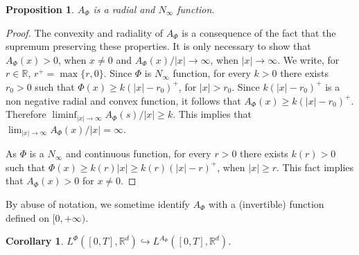 \documentclass[twoside]{article}
\newtheorem{cor}[thm]{Corollary}
\newtheorem{prop}[thm]{Proposition}
\theoremstyle{remark}
\newcounter{example}[section]
\newcommand{\lphi}{L^{\Phi}}
\newcommand{\rr}{\mathbb{R}}
\renewcommand{\leq}{\leqslant}
\renewcommand{\geq}{\geqslant}
\begin{document}
\begin{prop}\label{prop:AsubPhi}  $A_{\Phi}$ is a radial and $N_{\infty}$ function.
\end{prop}

\begin{proof} The convexity and radiality of $A_{\Phi}$ is a consequence of the fact that the supremum preserving these properties. It is only necessary to show that $A_{\Phi}(x)>0$, when $x\neq 0$ and  $A_{\Phi}(x)/|x|\to\infty$, when $|x|\to\infty$. We write, for $r\in\rr$, $r^+=\max\{r,0\}$. Since $\Phi$ is $N_{\infty}$ function,  for every $k>0$ there exists $r_0>0$ such that  $\Phi(x)\geq k(|x|-r_0)^+$, for $|x|>r_0$.  Since $ k(|x|-r_0)^+$ is a non negative radial and convex function, it follows that $A_{\Phi}(x)\geq k(|x|-r_0)^+$. Therefore $\liminf_{|x|\to\infty} A_{\Phi}(s)/|x|\geq k$. This implies that   $\lim_{|x|\to\infty} A_{\Phi}(x)/|x|=\infty$.

As $\Phi$ is a
$N_{\infty}$ and continuous function, for every $r>0$ there exists $k(r)>0$ such that $\Phi(x)\geq k(r)|x|\geq k(r)(|x|-r)^+$, when $|x|\geq r$. This fact implies that $A_{\Phi}(x)>0$ for $x\neq 0$.
\end{proof}
By abuse of notation, we sometime identify $A_{\Phi}$ with a (invertible) function defined on $[0,+\infty)$. 
\begin{cor}\label{cor:incr_aphi} $\lphi([0,T],\rr^d) \hookrightarrow L^{A_{\Phi}}([0,T],\rr^d)$.

\end{cor}
% 
% 
% 
% 
% 
% 
\end{document}
